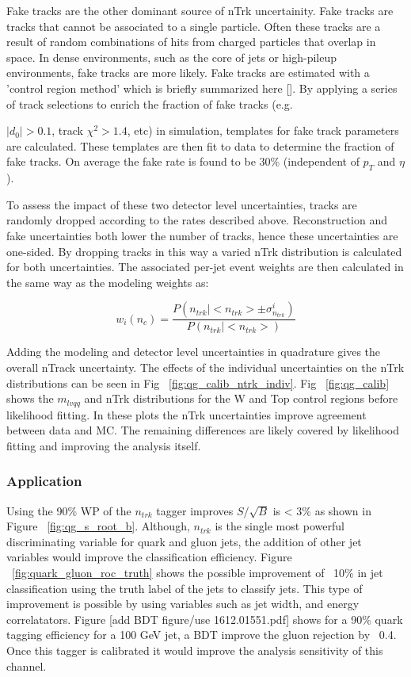 Fake tracks are the other dominant source of nTrk uncertainity. Fake tracks are tracks that cannot be associated to a single particle. Often these tracks are a result of random combinations of hits from charged particles that overlap in space. In dense environments, such as the core of jets or high-pileup environments, fake tracks are more likely. Fake tracks are estimated with a 'control region method' which is briefly summarized here [\cite{FakeTracks}]. By applying a series of track selections to enrich the fraction of fake tracks (e.g. {$|d_{0}| > 0.1$, track $\chi^{2}>1.4$, etc) in simulation, templates for fake track parameters are calculated. These templates are then fit to data to determine the fraction of fake tracks. On average the fake rate is found to be 30\% (independent of $p_{T}$ and $\eta$).

To assess the impact of these two detector level uncertainties, tracks are randomly dropped according to the rates described above. Reconstruction and fake uncertainties both lower the number of tracks, hence these uncertainties are one-sided. By dropping tracks in this way a varied nTrk distribution is calculated for both uncertainties. The associated per-jet event weights are then calculated in the same way as the modeling weights as:

\begin{equation}
w_{i}(n_{c}) = \frac{P(n_{trk}|<n_{trk}> \pm \sigma^{i}_{n_{trk}})} {P(n_{trk}|<n_{trk}>)}
\end{equation}


Adding the modeling and detector level uncertainties in quadrature gives the overall nTrack uncertainty. The effects of the individual uncertainties on the nTrk distributions can be seen in Fig ~\ref{fig:qg_calib_ntrk_indiv}. Fig ~\ref{fig:qg_calib} shows the $m_{lvqq}$ and nTrk distributions for the W and Top control regions before likelihood fitting. In these plots the nTrk uncertainties improve agreement between data and MC. The remaining differences are likely covered by likelihood fitting and improving the analysis itself.  

\subsubsection{Application}
Using the 90\% WP of the $n_{trk}$ tagger improves $S/\sqrt{B}$ is < 3\% as shown in Figure ~\ref{fig:qg_s_root_b}. Although, $n_{trk}$ is the single most powerful discriminating variable for quark and gluon jets, the addition of other jet variables would improve the classification efficiency. Figure ~\ref{fig:quark_gluon_roc_truth} shows the possible improvement of ~10\%  in jet classification using the truth label of the jets to classify jets.  This type of improvement is possible by using variables such as jet width, and energy correlatators. Figure [add BDT figure/use 1612.01551.pdf] shows for a 90\% quark tagging efficiency for a 100 GeV jet, a BDT improve the gluon rejection by ~0.4. Once this tagger is calibrated it would improve the analysis sensitivity of this channel.






}
